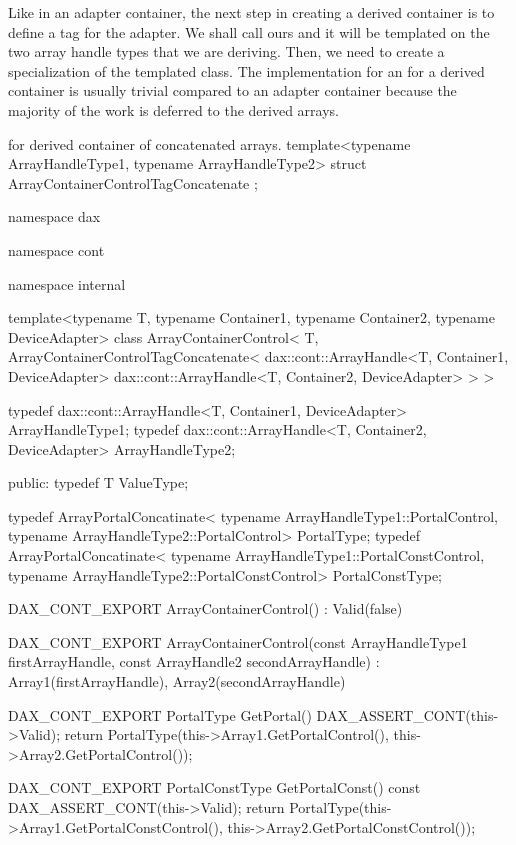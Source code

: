 Like in an adapter container, the next step in creating a derived container
is to define a tag for the adapter. We shall call ours
 and it will be templated on
the two array handle types that we are deriving. Then, we need to create a
specialization of the templated 
class. The implementation for an  for
a derived container is usually trivial compared to an adapter container
because the majority of the work is deferred to the derived arrays.

\begin{daxexample}[ex:DerivedArrayContainer]{ for derived container of concatenated arrays.}
template<typename ArrayHandleType1, typename ArrayHandleType2>
struct ArrayContainerControlTagConcatenate {  };

namespace dax {
namespace cont {
namespace internal {

template<typename T, typename Container1, typename Container2, typename DeviceAdapter>
class ArrayContainerControl<
    T,
    ArrayContainerControlTagConcatenate<
        dax::cont::ArrayHandle<T, Container1, DeviceAdapter>
        dax::cont::ArrayHandle<T, Container2, DeviceAdapter> > >
{
  typedef dax::cont::ArrayHandle<T, Container1, DeviceAdapter> ArrayHandleType1;
  typedef dax::cont::ArrayHandle<T, Container2, DeviceAdapter> ArrayHandleType2;

public:
  typedef T ValueType;

  typedef ArrayPortalConcatinate<
      typename ArrayHandleType1::PortalControl,
      typename ArrayHandleType2::PortalControl> PortalType;
  typedef ArrayPortalConcatinate<
      typename ArrayHandleType1::PortalConstControl,
      typename ArrayHandleType2::PortalConstControl> PortalConstType;

  DAX_CONT_EXPORT
  ArrayContainerControl() : Valid(false) {  }

  DAX_CONT_EXPORT
  ArrayContainerControl(const ArrayHandleType1 firstArrayHandle,
                        const ArrayHandle2 secondArrayHandle)
    : Array1(firstArrayHandle), Array2(secondArrayHandle) {  }

  DAX_CONT_EXPORT
  PortalType GetPortal() {
    DAX_ASSERT_CONT(this->Valid);
    return PortalType(this->Array1.GetPortalControl(), this->Array2.GetPortalControl());
  }

  DAX_CONT_EXPORT
  PortalConstType GetPortalConst() const {
    DAX_ASSERT_CONT(this->Valid);
    return PortalType(this->Array1.GetPortalConstControl(),
                      this->Array2.GetPortalConstControl());
  }

}}}}
\end{daxexample}
